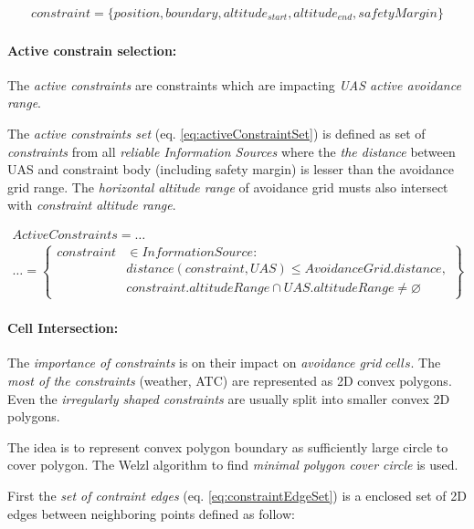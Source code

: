 \begin{multline}\label{eq:staticConstraint}
    constraint = \{position,boundary, altitude_{start},altitude_{end}, safety Margin\}
\end{multline}

\paragraph{Active constrain selection:} The \emph{active constraints} are constraints which are impacting \emph{UAS active avoidance range}. 

The \emph{active constraints set} (eq. \ref{eq:activeConstraintSet}) is defined as set of \emph{constraints} from all \emph{reliable Information Sources} where the \emph{the distance} between UAS and constraint body (including safety margin) is lesser than the avoidance grid range. The \emph{horizontal altitude range} of avoidance grid musts also intersect with \emph{constraint altitude range}.

\begin{multline}\label{eq:activeConstraintSet}
    Active Constraints = \dots\\\dots =
    \left\{\begin{aligned}constraint& \in Information Source:\\ 
    &distance(constraint,UAS) \le Avoidance Grid. distance,\\
    &constraint.altitude Range \cap UAS.altitude Range \neq \varnothing 
    \end{aligned}\right\}
\end{multline}

\paragraph{Cell Intersection:} The \emph{importance of constraints} is on their impact on \emph{avoidance grid} $cells$. The \emph{most of the constraints} (weather, ATC) are represented as 2D convex polygons. Even the \emph{irregularly shaped constraints} are usually split into smaller convex 2D polygons.

The idea is to represent convex polygon boundary as sufficiently large circle to cover polygon. The Welzl algorithm to find \emph{minimal polygon cover circle} \cite{welzl1991smallest} is used.

First the \emph{set of contraint edges} (eq. \ref{eq:constraintEdgeSet}) is a enclosed set of 2D edges between neighboring points defined as follow:

